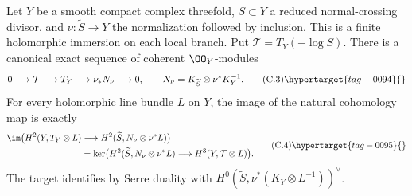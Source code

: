 \begin{proposition}\hypertarget{tag-01FR}{}\label{cdp:st:C5a}


Let $Y$ be a smooth compact complex threefold, $S\subset Y$ a reduced normal-crossing divisor, and $\nu:\widetilde S\to Y$ the normalization followed by inclusion. This is a finite holomorphic immersion on each local branch. Put $\mathcal T=T_Y(-\log S)$. There is a canonical exact sequence of coherent $\OO_Y$-modules
\[
0\longrightarrow\mathcal T\longrightarrow T_Y
 \longrightarrow\nu_*N_\nu\longrightarrow0,
\qquad N_\nu=K_{\widetilde S}\otimes\nu^*K_Y^{-1}.      \tag{C.3}\hypertarget{tag-0094}{}\label{cdp:eq:C.3}
\]
For every holomorphic line bundle $L$ on $Y$, the image of the natural cohomology map is exactly
\[
\begin{split}
\im\bigl(H^2(Y,T_Y\otimes L)&\longrightarrow
 H^2(\widetilde S,N_\nu\otimes\nu^*L)\bigr)\\
 &=\ker\bigl(H^2(\widetilde S,N_\nu\otimes\nu^*L)
 \longrightarrow H^3(Y,\mathcal T\otimes L)\bigr).
\end{split}                                             \tag{C.4}\hypertarget{tag-0095}{}\label{cdp:eq:C.4}
\]
The target identifies by Serre duality with
$H^0(\widetilde S,\nu^*(K_Y\otimes L^{-1}))^\vee$.
\end{proposition}

